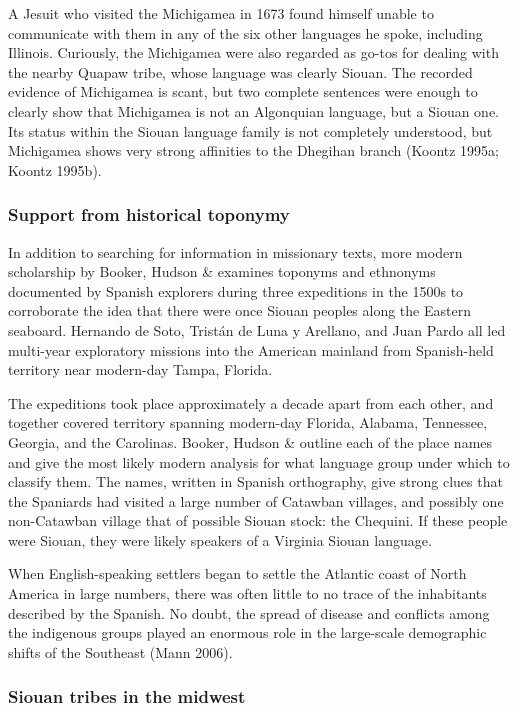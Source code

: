 \documentclass[output=paper]{LSP/langsci}
\begin{document}
A Jesuit who visited the Michigamea in 1673 found himself unable to communicate with them in any of the six other languages he spoke, including Illinois. Curiously, the Michigamea were also regarded as go-tos for dealing with the nearby Quapaw tribe, whose language was clearly Siouan. The recorded evidence of Michigamea is scant, but two complete sentences were enough to clearly show that Michigamea is not an Algonquian language, but a Siouan one. Its status within the Siouan language family is not completely understood, but Michigamea shows very strong affinities to the Dhegihan branch (Koontz 1995a; Koontz 1995b).

\subsubsection{Support from historical toponymy} In addition to searching for information in missionary texts, more modern scholarship by Booker, Hudson \& \citet{Rankin1992} examines toponyms and ethnonyms documented by Spanish explorers during three expeditions in the 1500s to corroborate the idea that there were once Siouan peoples along the Eastern seaboard. Hernando de Soto, Trist\'an de Luna y Arellano, and Juan Pardo all led multi-year exploratory missions into the American mainland from Spanish-held territory near modern-day Tampa, Florida. 

The expeditions took place approximately a decade apart from each other, and together covered territory spanning modern-day Florida, Alabama, Tennessee, Georgia, and the Carolinas. Booker, Hudson \& \citet{Rankin1992} outline each of the place names and give the most likely modern analysis for what language group under which to classify them. The names, written in Spanish orthography, give strong clues that the Spaniards had visited a large number of Catawban villages, and possibly one non-Catawban village that of possible Siouan stock: the Chequini. If these people were Siouan, they were likely speakers of a Virginia Siouan language.

When English-speaking settlers began to settle the Atlantic coast of North America in large numbers, there was often little to no trace of the inhabitants described by the Spanish. No doubt, the spread of disease and conflicts among the indigenous groups played an enormous role in the large-scale demographic shifts of the Southeast (Mann 2006). 

\subsubsection{Siouan tribes in the midwest}
\end{document}
